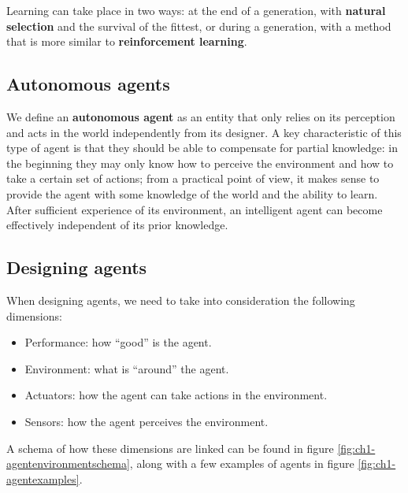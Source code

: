 Learning can take place in two ways: at the end of a generation, with \textbf{natural selection} and the survival of the fittest, or during a generation, with a method that is more similar to \textbf{reinforcement learning}.

\subsection{Autonomous agents}
We define an \textbf{autonomous agent} as an entity that only relies on its perception and acts in the world independently from its designer. A key characteristic of this type of agent is that they should be able to compensate for partial knowledge: in the beginning they may only know how to perceive the environment and how to take a certain set of actions; from a practical point of view, it makes sense to provide the agent with some knowledge of the world and the ability to learn. After sufficient experience of its environment, an intelligent agent can become effectively independent of its prior knowledge.

\subsection{Designing agents}
When designing agents, we need to take into consideration the following dimensions:

\begin{itemize}
    \item Performance: how ``good'' is the agent.
    \item Environment: what is ``around'' the agent.
    \item Actuators: how the agent can take actions in the environment.
    \item Sensors: how the agent perceives the environment.
\end{itemize}

A schema of how these dimensions are linked can be found in figure \ref{fig:ch1-agentenvironmentschema}, along with a few examples of agents in figure \ref{fig:ch1-agentexamples}.

